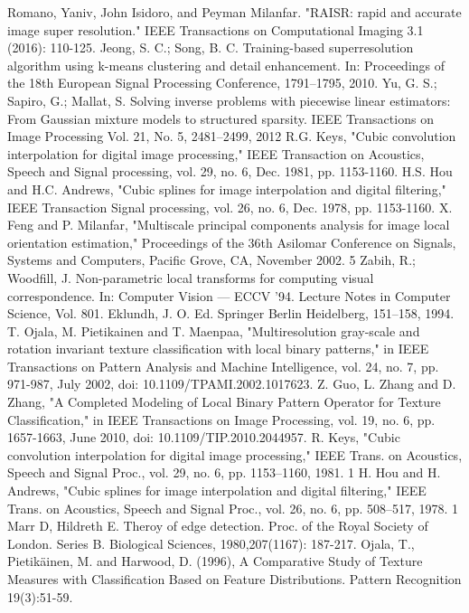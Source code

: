 \documentclass[12pt, a4paper, oneside]{ctexbook}
\begin{document}
	\newpage
	\begin{thebibliography}{99}
		Romano, Yaniv, John Isidoro, and Peyman Milanfar. "RAISR: rapid and accurate image super resolution." IEEE Transactions on Computational Imaging 3.1 (2016): 110-125.
		Jeong, S. C.; Song, B. C. Training-based superresolution algorithm using k-means clustering and detail enhancement. In: Proceedings of the 18th European Signal Processing Conference, 1791–1795, 2010.
		 Yu, G. S.; Sapiro, G.; Mallat, S. Solving inverse problems with piecewise linear estimators: From Gaussian mixture models to structured sparsity. IEEE Transactions on Image Processing Vol. 21, No. 5, 2481–2499, 2012
		R.G. Keys, "Cubic convolution interpolation for digital image processing," IEEE Transaction on Acoustics, Speech and Signal processing, vol. 29, no. 6, Dec. 1981, pp. 1153-1160.
		H.S. Hou and H.C. Andrews, "Cubic splines for image interpolation and digital filtering," IEEE Transaction Signal processing, vol. 26, no. 6, Dec. 1978, pp. 1153-1160.
		X. Feng and P. Milanfar, "Multiscale principal components analysis for image local orientation estimation," Proceedings of the 36th Asilomar Conference on Signals, Systems and Computers, Pacific Grove, CA, November 2002. 5
		Zabih, R.; Woodfill, J. Non-parametric local transforms for computing visual correspondence. In: Computer Vision — ECCV '94. Lecture Notes in Computer Science, Vol. 801. Eklundh, J. O. Ed. Springer Berlin Heidelberg, 151–158, 1994.
		T. Ojala, M. Pietikainen and T. Maenpaa, "Multiresolution gray-scale and rotation invariant texture classification with local binary patterns," in IEEE Transactions on Pattern Analysis and Machine Intelligence, vol. 24, no. 7, pp. 971-987, July 2002, doi: 10.1109/TPAMI.2002.1017623.
		Z. Guo, L. Zhang and D. Zhang, "A Completed Modeling of Local Binary Pattern Operator for Texture Classification," in IEEE Transactions on Image Processing, vol. 19, no. 6, pp. 1657-1663, June 2010, doi: 10.1109/TIP.2010.2044957.
		 R. Keys, "Cubic convolution interpolation for digital image processing," IEEE Trans. on Acoustics, Speech and Signal Proc., vol. 29, no. 6, pp. 1153–1160, 1981. 1
		H. Hou and H. Andrews, "Cubic splines for image interpolation and digital filtering," IEEE Trans. on Acoustics, Speech and Signal Proc., vol. 26, no. 6, pp. 508–517, 1978. 1
		Marr D, Hildreth E. Theroy of edge detection. Proc. of the Royal Society of London. Series B. Biological Sciences, 1980,207(1167): 187-217.
		Ojala, T., Pietikäinen, M. and Harwood, D. (1996), A Comparative Study of Texture Measures with Classification Based on Feature Distributions. Pattern Recognition 19(3):51-59.
	\end{thebibliography}
	
	
\end{document}
